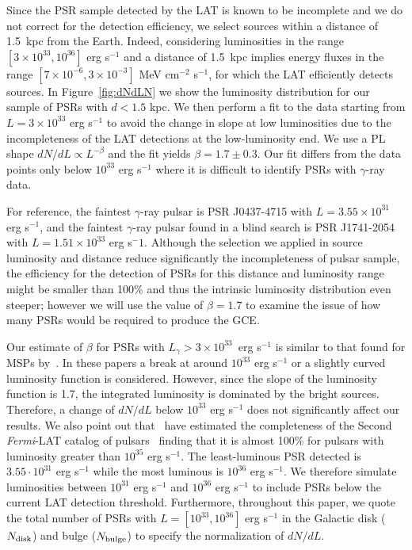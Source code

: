\documentclass[iop]{emulateapj}
\begin{document}
Since the PSR sample detected by the LAT is known to be incomplete and
we do not correct for the detection efficiency, we select sources
within a distance of 1.5~kpc from the Earth.  Indeed, considering
luminosities in the range $[3\times 10^{33},10^{36}]$ erg s$^{-1}$ and
a distance of 1.5~kpc implies energy fluxes in the range
$[7 \times10^{-6},3\times 10^{-3}]$ MeV cm$^{-2}$ s$^{-1}$, for which
the LAT efficiently detects sources.  
In Figure~\ref{fig:dNdLN} we
show the luminosity distribution for our sample of PSRs with $d<1.5$
kpc.  We then perform a fit to the data starting from
$L=3\times 10^{33}$ erg s$^{-1}$ to avoid the change in slope at low
luminosities due to the incompleteness of the LAT detections at the
low-luminosity end. We use a PL shape $dN/dL\propto L^{-\beta}$ and
the fit yields $\beta=1.7\pm0.3$. 
Our fit differs from the data
points only below $10^{33}$ erg s$^{-1}$ where it is
difficult to identify PSRs with $\gamma$-ray data.  

  For reference, the faintest $\gamma$-ray pulsar is PSR J0437-4715 with
  $L=3.55\times10^{31}$ erg s$^{-1}$, and the faintest
  $\gamma$-ray pulsar found in a blind search is PSR J1741-2054 with
  $L=1.51\times10^{33}$ erg s${^-1}$.
Although the selection we applied in source luminosity and distance reduce significantly 
the incompleteness of pulsar sample,
the efficiency for the detection of PSRs for this distance and luminosity 
range might be smaller than 100\% and thus the intrinsic luminosity
distribution even steeper; however we will use the value of 
$\beta=1.7$ to examine the issue of how many PSRs would be required
to produce the GCE.

Our estimate of $\beta$ for PSRs with
$L_{\gamma}> 3\times 10^{33}$~erg s$^{-1}$ is similar to that found for
MSPs by~\citet{Cholis:2014noa, Hooper:2015jlu,Winter:2016wmy}.  In
these papers a break at around $10^{33}$ erg s$^{-1}$ or a slightly curved
luminosity function is considered.  However, since the slope of the
luminosity function is 1.7, the integrated luminosity is dominated by
the bright sources.  Therefore, a change of $dN/dL$ below $10^{33}$
erg s$^{-1}$ does not significantly affect our results.  We also point out
that~\citet{Winter:2016wmy} have estimated the completeness of the
Second {\it Fermi}-LAT catalog of pulsars~\citep{2013ApJS..208...17A}
finding that it is almost 100\% for pulsars with luminosity greater than
$10^{35}$ erg s$^{-1}$.  The least-luminous PSR detected is $3.55\cdot 10^{31}$
erg s$^{-1}$ while the most luminous is $10^{36}$ erg s$^{-1}$. We therefore
simulate luminosities between $10^{31}$ erg s$^{-1}$ and $10^{36}$ erg s$^{-1}$ to
include PSRs below the current LAT detection threshold.
Furthermore, throughout this paper, we quote the total
  number of PSRs with $L = [10^{33}, 10^{36}]$ erg s$^{-1}$ in the Galactic disk ($N_{\rm disk}$) 
  and bulge ($N_{\rm bulge}$) to specify the normalization of $dN/dL$.
\end{document}
